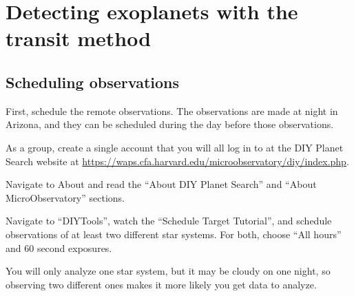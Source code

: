 \chapter{Detecting exoplanets with the transit method}

\setcounter{section}{2}

\section{Scheduling observations}

First, schedule the remote observations. The observations are made at night in Arizona, and they can be scheduled during the day before those observations.

\begin{steps}

	\item As a group, create a single account that you will all log in to at the DIY Planet Search website at \url{https://waps.cfa.harvard.edu/microobservatory/diy/index.php}.
	
	\item Navigate to About and read the ``About DIY Planet Search'' and ``About MicroObservatory'' sections.
	
	
	\item Navigate to ``DIYTools'', watch the ``Schedule Target Tutorial'', and schedule observations of at least two different star systems. For both, choose ``All hours'' and 60 second exposures.
	
\end{steps}

You will only analyze one star system, but it may be cloudy on one night, so observing two different ones makes it more likely you get data to analyze.

